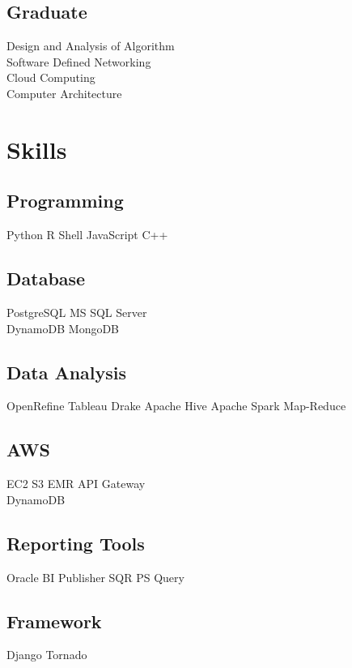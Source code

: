 \documentclass[letterpaper]{deedy-resume} %
\begin{document}
\begin{minipage}[t]{0.33\textwidth}
\subsection{Graduate}

Design and Analysis of Algorithm \\
Software Defined Networking \\
Cloud Computing \\ 
Computer Architecture

\sectionspace %



\section{Skills}

\subsection{Programming}
Python \textbullet{} R \textbullet{} Shell \textbullet{} JavaScript \textbullet{} C++
\subsection{Database}
PostgreSQL \textbullet{} MS SQL Server \\ \textbullet{} DynamoDB \textbullet{} MongoDB
\subsection{Data Analysis}
OpenRefine \textbullet{} Tableau \textbullet{} Drake \textbullet{} Apache Hive \textbullet{} Apache Spark
\textbullet{} Map-Reduce
\subsection{AWS}
EC2 \textbullet{} S3 \textbullet{} EMR \textbullet{} API Gateway \\ \textbullet{} DynamoDB
\subsection{Reporting Tools}
Oracle BI Publisher \textbullet{} SQR \textbullet{} PS Query 
\subsection{Framework}
Django \textbullet{} Tornado


\end{minipage}
\end{document}
